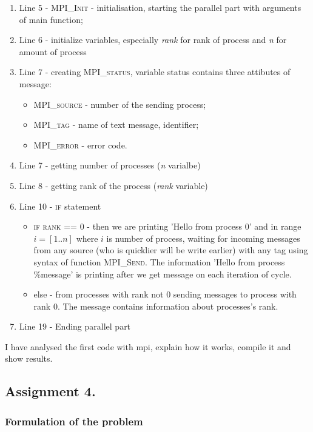 \documentclass[%
12pt, %
final, %
oneside, %
onecolumn, %
centertags]{article} %
\theoremstyle{plain}
\theoremstyle{definition}
\theoremstyle{remark}
\begin{document}
\begin{enumerate}
	\item Line 5 - \textsc{MPI\_Init} - initialisation, starting the parallel part with arguments of main function;
	\item Line 6 - initialize variables, especially \textit{rank} for rank of process and \textit{n} for amount of process
	\item Line 7 - creating \textsc{MPI\_status}, variable status contains three attibutes of message:
	\begin{itemize}
		\item \textsc{MPI\_source} - number of the sending process;
		\item \textsc{MPI\_tag} - name of text message, identifier;
		\item \textsc{MPI\_error} - error code.
	\end{itemize}
	\item Line 7 - getting number of processes (\textit{n} varialbe)
	\item Line 8 - getting rank of the process (\textit{rank} variable)
	\item Line 10 - \textsc{if} statement
	\begin{itemize}
		\item \textsc{if rank == 0} - then we are printing 'Hello from process 0' and in range $i=[1..n]$ where $i$ is number of process, waiting for incoming messages from any source (who is quicklier will be write earlier) with any tag using syntax of function \textsc{MPI\_Send}. The information 'Hello from process \%message' is printing after we get message on each iteration of cycle.
		\item else - from processes with rank not $0$ sending messages to process with rank $0$. The message contains information about processes's rank.
	\end{itemize}
	\item Line 19 - Ending parallel part
\end{enumerate}

I have analysed the first code with mpi, explain how it works, compile it and show results.

\newpage
\subsection{Assignment 4.}

\subsubsection{Formulation of the problem}
\end{document}
